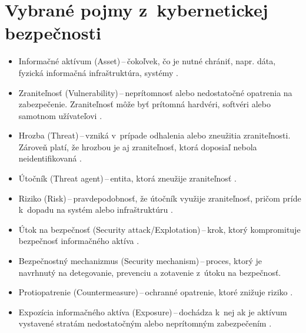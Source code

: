 \section{Vybrané pojmy z~kybernetickej bezpečnosti}
\begin{itemize}
	\item Informačné aktívum (Asset)\,--\,čokoľvek, čo je nutné chrániť, napr. dáta, fyzická informačná infraštruktúra, systémy \cite{McMillan2018}.\\
	
	\item Zraniteľnosť (Vulnerability)\,--\,neprítomnosť alebo nedostatočné opatrenia na zabezpečenie. Zraniteľnosť môže byť prítomná hardvéri, softvéri alebo samotnom užívateľovi \cite{McMillan2018}.\\
	
	\item Hrozba (Threat)\,--\,vzniká v~prípade odhalenia alebo zneužitia zraniteľnosti. Zároveň platí, že hrozbou je aj zraniteľnosť, ktorá doposiaľ nebola neidentifikovaná \cite{McMillan2018}.\\
	
	\item Útočník (Threat agent)\,--\,entita, ktorá zneužije zraniteľnosť \cite{McMillan2018}.\\
    
    \item Riziko (Risk)\,--\,pravdepodobnosť, že útočník využije zraniteľnosť, pričom príde k~dopadu na systém alebo infraštruktúru \cite{McMillan2018}.\\
  	
  	\item Útok na bezpečnosť (Security attack/Explotation)\,--\,krok, ktorý kompromituje bezpečnosť informačného aktíva \cite{Vyncke2008}.\\
  	    
	\item Bezpečnostný mechanizmus (Security mechanism)\,--\,proces, ktorý je navrhnutý na detegovanie, prevenciu a zotavenie z~útoku na bezpečnosť. \\
	
	\item Protiopatrenie (Countermeasure)\,--\,ochranné opatrenie, ktoré znižuje riziko \cite{McMillan2018}.\\
	
	\item Expozícia informačného aktíva (Exposure)\,--\,dochádza k~nej ak je aktívum vystavené stratám nedostatočným alebo neprítomným zabezpečením \cite{McMillan2018}.\\
	
\end{itemize}

